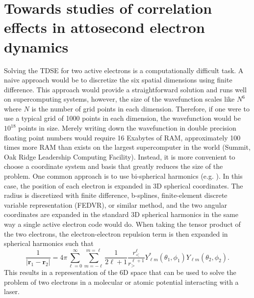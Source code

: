 \chapter{Towards studies of correlation effects in attosecond electron dynamics} %
\label{cha:electron_correlation}


Solving the TDSE for two active electrons is a computationally difficult task. A naive approach would be to discretize the six spatial dimensions using finite difference. This approach would provide a straightforward solution and runs well on supercomputing systems, however, the size of the wavefunction scales like $N^6$ where $N$ is the number of grid points in each dimension. Therefore, if one were to use a typical grid of 1000 points in each dimension, the wavefunction would be $10^{18}$ points in size. Merely writing down the wavefunction in double precision floating point numbers would require 16 Exabytes of RAM, approximately 100 times more RAM than exists on the largest supercomputer in the world (Summit, Oak Ridge Leadership Computing Facility). Instead, it is more convenient to choose a coordinate system and basis that greatly reduces the size of the problem. One common approach is to use bi-spherical harmonics (e.g. \cite{vanroose2006}). In this case, the position of each electron is expanded in 3D spherical coordinates. The radius is discretized with finite difference, b-splines, finite-element discrete variable representation (FEDVR), or similar method, and the two angular coordinates are expanded in the standard 3D spherical harmonics in the same way a single active electron code would do. When taking the tensor product of the two electrons, the electron-electron repulsion term is then expanded in spherical harmonics such that
\begin{equation}
    \frac{1}{|\mathbf{r}_1-\mathbf{r}_2|}= 4\pi \sum_{\ell=0}^\infty \sum_{m=-\ell}^{m=\ell}\frac{1}{2\ell+1}\frac{r_<^\ell}{r_>^{\ell+1}}Y_{\ell m}^*(\theta_1, \phi_1)Y_{\ell m}(\theta_2, \phi_2).
\end{equation}
This results in a representation of the 6D space that can be used to solve the problem of two electrons in a molecular or atomic potential interacting with a laser.

